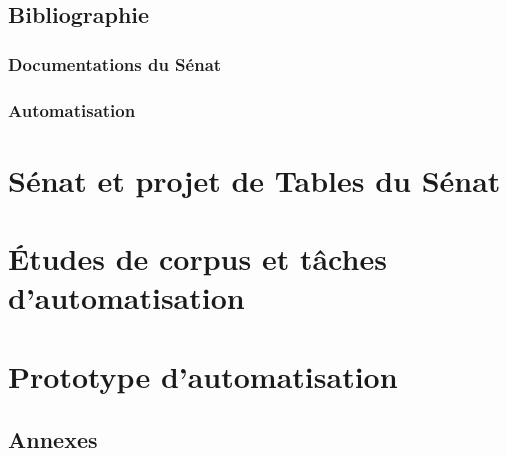 \documentclass[a4paper,12pt,twoside]{book}
\newcommand{\clearemptydoublepage}{\newpage{\pagestyle{empty}\cleardoublepage}}
\begin{document}
	\onehalfspacing 
	
	\frontmatter
	
	
	\thispagestyle{empty}
	\clearemptydoublepage

	
	\thispagestyle{empty}
	\clearemptydoublepage


	
	\clearemptydoublepage

        \chapter{Bibliographie}
        \section*{Documentations du Sénat}
        \printbibliography[keyword=senat,heading=none]
        \section*{Automatisation}
        \printbibliography[keyword=auto,heading=none]
        \clearemptydoublepage


        \mainmatter

	
	\newpage{\pagestyle{empty}\cleardoublepage}
	
	\part{Sénat et projet de Tables du Sénat}
	
	

 
	\part{Études de corpus et tâches d'automatisation }
	
	
	
	\part{Prototype d’automatisation}
	
	
	
	
	\newpage{\pagestyle{empty}\cleardoublepage}

	\chapter*{Annexes}
\end{document}
